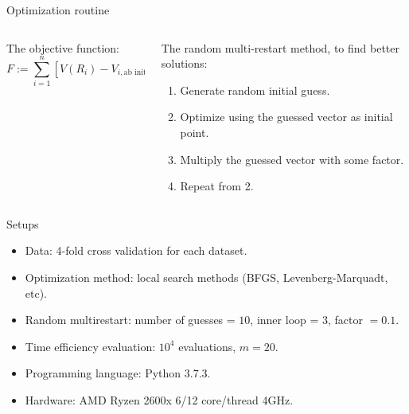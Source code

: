 \documentclass{beamer}
\begin{document}
\begin{frame}{Optimization routine}
    \begin{columns}[c]
        \begin{column}{0.45\textwidth}
            \item The objective function:
            \begin{equation}
                F := \sum^n_{i=1}\left[V(R_i) - V_{i,\text{ab initio}}\right]^2.
                \label{eq:sumsquaredresidual}
            \end{equation}
        \end{column}
        \vrule{}
        \begin{column}{0.55\textwidth}
            \item The random multi-restart method, to find better solutions: \begin{enumerate}
                \item Generate random initial guess.
                \item Optimize using the guessed vector as initial point.
                \item Multiply the guessed vector with some factor.
                \item Repeat from 2.
            \end{enumerate}
        \end{column}
    \end{columns}
\end{frame}
\begin{frame}{Setups}
    \begin{itemize}
        \item Data: 4-fold cross validation for each dataset.
        \item Optimization method: local search methods (BFGS, Levenberg-Marquadt, etc). 
        \item Random multirestart: number of guesses = $10$, inner loop = $3$, factor $= 0.1$. 
        \item Time efficiency evaluation: $10^4$ evaluations, $m=20$.
        \item Programming language: Python 3.7.3.
        \item Hardware: AMD Ryzen 2600x 6/12 core/thread 4GHz.
    \end{itemize}
\end{frame}
\end{document}
